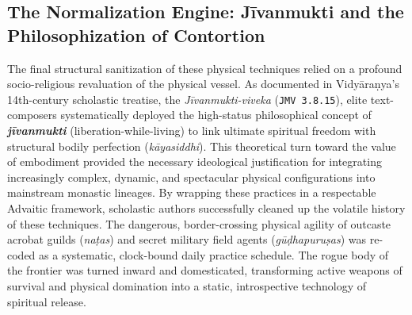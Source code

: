 \documentclass[11pt,letterpaper]{article}
\begin{document}
\subsection{The Normalization Engine: Jīvanmukti and the Philosophization of Contortion}
The final structural sanitization of these physical techniques relied on a profound socio-religious revaluation of the physical vessel. As documented in Vidyāraṇya's 14th-century scholastic treatise, the \textit{Jīvanmukti-viveka} (\texttt{JMV 3.8.15}), elite text-composers systematically deployed the high-status philosophical concept of \textbf{\textit{jīvanmukti}} (liberation-while-living) to link ultimate spiritual freedom with structural bodily perfection (\textit{kāyasiddhi}). This theoretical turn toward the value of embodiment provided the necessary ideological justification for integrating increasingly complex, dynamic, and spectacular physical configurations into mainstream monastic lineages. By wrapping these practices in a respectable Advaitic framework, scholastic authors successfully cleaned up the volatile history of these techniques. The dangerous, border-crossing physical agility of outcaste acrobat guilds (\textit{naṭas}) and secret military field agents (\textit{gūḍhapuruṣas}) was re-coded as a systematic, clock-bound daily practice schedule. The rogue body of the frontier was turned inward and domesticated, transforming active weapons of survival and physical domination into a static, introspective technology of spiritual release.
\end{document}
